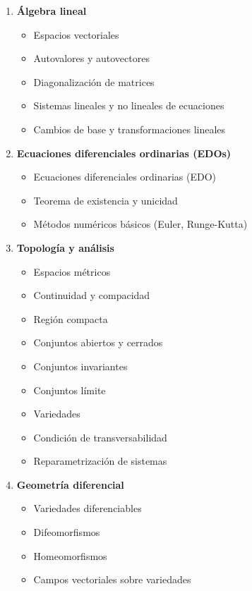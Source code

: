\begin{enumerate}
	\item \textbf{Álgebra lineal}
	\begin{itemize}
		\item Espacios vectoriales
		\item Autovalores y autovectores \checkmark
		\item Diagonalización de matrices \checkmark
		\item Sistemas lineales y no lineales de ecuaciones \checkmark
		\item Cambios de base y transformaciones lineales
	\end{itemize}
	
	\item \textbf{Ecuaciones diferenciales ordinarias (EDOs)}
	\begin{itemize}
		\item Ecuaciones diferenciales ordinarias (EDO) \checkmark
		\item Teorema de existencia y unicidad \checkmark
		\item Métodos numéricos básicos (Euler, Runge-Kutta)
	\end{itemize}
	
	\item \textbf{Topología y análisis}
	\begin{itemize}
		\item Espacios métricos
		\item Continuidad y compacidad
		\item Región compacta
		\item Conjuntos abiertos y cerrados
		\item Conjuntos invariantes
		\item Conjuntos límite
		\item Variedades
		\item Condición de transversabilidad
		\item Reparametrización de sistemas
	\end{itemize}
	
	\item \textbf{Geometría diferencial}
	\begin{itemize}
		\item Variedades diferenciables
		\item Difeomorfismos
		\item Homeomorfismos
		\item Campos vectoriales sobre variedades
	\end{itemize}
	

\end{enumerate}
